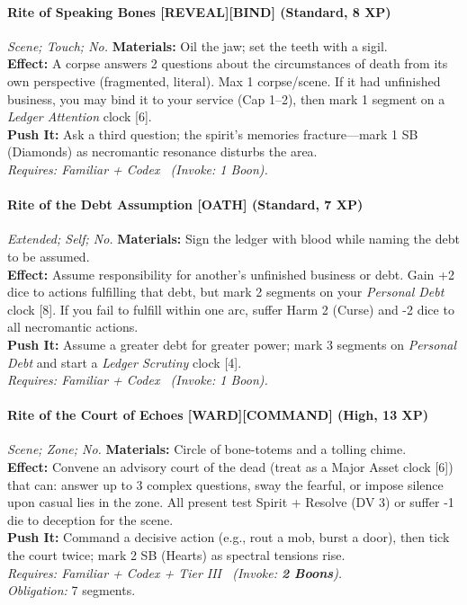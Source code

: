 \paragraph{Rite of Speaking Bones \textnormal{[REVEAL][BIND]} (Standard, 8 XP)} \emph{Scene; Touch; No.}
\textbf{Materials:} Oil the jaw; set the teeth with a sigil.\\
\textbf{Effect:} A corpse answers 2 questions about the circumstances of death from its own perspective (fragmented, literal). Max 1 corpse/scene. If it had unfinished business, you may bind it to your service (Cap 1–2), then mark 1 segment on a \emph{Ledger Attention} clock [6].\\
\textbf{Push It:} Ask a third question; the spirit's memories fracture—mark 1 SB (Diamonds) as necromantic resonance disturbs the area.\\
\emph{Requires: Familiar + Codex \ (\textit{Invoke:} 1 Boon).}

\paragraph{Rite of the Debt Assumption \textnormal{[OATH]} (Standard, 7 XP)} \emph{Extended; Self; No.}
\textbf{Materials:} Sign the ledger with blood while naming the debt to be assumed.\\
\textbf{Effect:} Assume responsibility for another's unfinished business or debt. Gain +2 dice to actions fulfilling that debt, but mark 2 segments on your \emph{Personal Debt} clock [8]. If you fail to fulfill within one arc, suffer Harm 2 (Curse) and -2 dice to all necromantic actions.\\
\textbf{Push It:} Assume a greater debt for greater power; mark 3 segments on \emph{Personal Debt} and start a \emph{Ledger Scrutiny} clock [4].\\
\emph{Requires: Familiar + Codex \ (\textit{Invoke:} 1 Boon).}

\paragraph{Rite of the Court of Echoes \textnormal{[WARD][COMMAND]} (High, 13 XP)} \emph{Scene; Zone; No.}
\textbf{Materials:} Circle of bone-totems and a tolling chime.\\
\textbf{Effect:} Convene an advisory court of the dead (treat as a Major Asset clock [6]) that can: answer up to 3 complex questions, sway the fearful, or impose silence upon casual lies in the zone. All present test Spirit + Resolve (DV 3) or suffer -1 die to deception for the scene.\\
\textbf{Push It:} Command a decisive action (e.g., rout a mob, burst a door), then tick the court twice; mark 2 SB (Hearts) as spectral tensions rise.\\
\emph{Requires: Familiar + Codex + Tier III \ (\textit{Invoke:} \textbf{2 Boons}).}\\
\emph{Obligation:} 7 segments.

